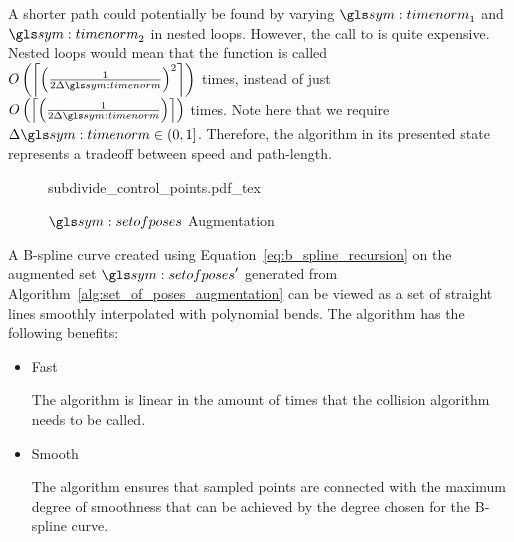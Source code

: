 		A shorter path could potentially be found by varying $\timenorm_1$ and
		$\timenorm_2$ in nested loops. However, the call to
		 is quite expensive. Nested loops
		would mean that the function is called
		\(
			O
			\left(
				\ceil*
				{%
					{%
						\left(
							\frac
							{%
								1
							}
							{%
								2\Delta\timenorm
							}
						\right)
					}^2
				}
			\right)
		\)
		times, instead of just
		\(
			O
			\left(
				\ceil*
				{%
					\left(
						\frac
						{%
							1
						}
						{%
							2\Delta\timenorm
						}
					\right)
				}
			\right)
		\)
		times. Note here that we require $\Delta\timenorm \in (0, 1]$.
		Therefore, the algorithm in its presented state represents a tradeoff
		between speed and path-length.

		\begin{figure}[hb]
			\centering
			\def\svgwidth{0.8\columnwidth}
			{subdivide_control_points.pdf_tex}
			\caption{$\setofposes$ Augmentation}%
			\label{fig:set_of_poses_augmentation}
		\end{figure}

		A B-spline curve created using Equation~\ref{eq:b_spline_recursion} on
		the augmented set $\setofposes'$ generated from
		Algorithm~\ref{alg:set_of_poses_augmentation} can be viewed as a set of
		straight lines smoothly interpolated with polynomial bends. The
		algorithm has the following benefits:

		\begin{itemize}

			\item Fast

				The algorithm is linear in the amount of times that the
				collision algorithm needs to be called.

			\item Smooth

				The algorithm ensures that sampled points are connected with the
				maximum degree of smoothness that can be achieved by the degree
				chosen for the B-spline curve.
		\end{itemize}
